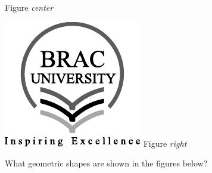 \documentclass[12pt]{exam}
\begin{document}
\begin{questions}
\begin{minipage}[t]{0.3\textwidth}
    Figure \emph{center}
\end{minipage}\hfill
\begin{minipage}[t]{0.3\textwidth}
    \centering
    \includegraphics[width=\linewidth]{bracu_logo_ai.pdf}
    Figure \emph{right}
\end{minipage}

\question[3.5] What geometric shapes are shown in the figures below?


\end{questions}
\end{document}
